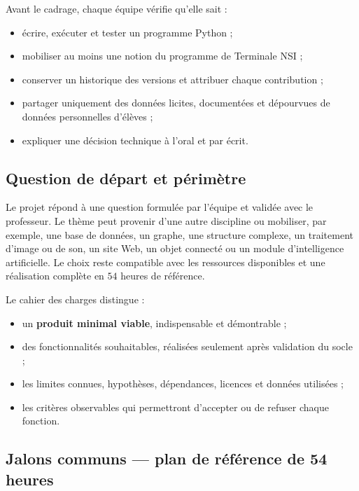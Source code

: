 Avant le cadrage, chaque équipe vérifie qu'elle sait :
\begin{itemize}
  \item écrire, exécuter et tester un programme Python ;
  \item mobiliser au moins une notion du programme de Terminale NSI ;
  \item conserver un historique des versions et attribuer chaque contribution ;
  \item partager uniquement des données licites, documentées et dépourvues de données
        personnelles d'élèves ;
  \item expliquer une décision technique à l'oral et par écrit.
\end{itemize}

\subsection*{Question de départ et périmètre}

Le projet répond à une question formulée par l'équipe et validée avec le professeur. Le
thème peut provenir d'une autre discipline ou mobiliser, par exemple, une base de données,
un graphe, une structure complexe, un traitement d'image ou de son, un site Web, un objet
connecté ou un module d'intelligence artificielle. Le choix reste compatible avec les
ressources disponibles et une réalisation complète en $54$ heures de référence.

Le cahier des charges distingue :
\begin{itemize}
  \item un \textbf{produit minimal viable}, indispensable et démontrable ;
  \item des fonctionnalités souhaitables, réalisées seulement après validation du socle ;
  \item les limites connues, hypothèses, dépendances, licences et données utilisées ;
  \item les critères observables qui permettront d'accepter ou de refuser chaque fonction.
\end{itemize}


\subsection*{Jalons communs — plan de référence de 54 heures}

